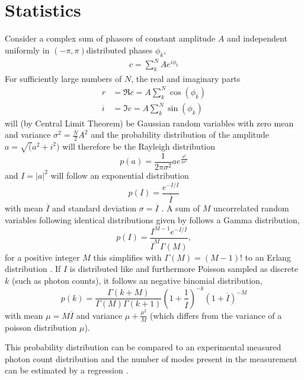 \section{Statistics}
Consider a complex sum of phasors of constant amplitude $A$ and independent uniformly in $(-\pi,\pi)$distributed phases $\phi_k$,
\begin{align}
c=\sum^N_k A e^{i\phi_k}
\end{align}
For sufficiently large numbers of $N$, the real and imaginary parts
\begin{align*}
r&=\Re c =  A \sum^N_k \cos(\phi_k)\\
i&= \Im c =A \sum^N_k \sin(\phi_k)
\end{align*}
will (by Central Limit Theorem) be Gaussian random variables with zero mean and variance $\sigma^2=\frac{N}{2}A^2$ and the probability distribution of the amplitude $a=\sqrt(a^2+i^2)$ will  therefore be the Rayleigh distribution
\begin{equation}
p(a)=\frac{1}{2\pi\sigma^2} a e^{\frac{a^2}{2\sigma^2}}
\end{equation}
and  $I=\left|a\right|^2$ will  follow an exponential distribution
\begin{equation}
\label{eq:expdistr}
p(I)=\frac{ e^{-I/\overline{I}}}{\overline{I}}
\end{equation} 
with mean $\overline{I}$ and standard deviation $\sigma=\overline{I}$  \cite{goodman2000,goodman1976}.
A sum of $M$ uncorrelated random variables following identical distributions given by  follows a Gamma distribution,
\begin{equation}
\label{eq:gammadistr}
p(I)=\frac{I^{M-1} e^{-I/\overline{I}}} {\overline{I}^M \Gamma(M)},
\end{equation}
for a positive integer $M$ this simplifies with $\Gamma(M)=(M-1)!$ to an Erlang distribution  \cite{forbes2010,trost2020}.
If $I$ is distributed like  and furthermore Poisson sampled as discrete $k$ (such as photon counts), it follows  an negative binomial distribution,
\cite{trost2020,mandel1959,holmes2019}
\begin{equation}
p(k)=
\frac{\Gamma(k+M)}{\Gamma(M)\Gamma(k+1) }
\left( 1+\frac{1}{\overline{I}}
\right)^{-k}
\left( 1+\overline{I}
\right)^{-M}
\end{equation}
with mean $\mu=M\overline{I}$ and variance $\mu+\frac{\mu^2}{M}$ (which differs from the variance of a poisson distribution $\mu$).

This probability distribution can be compared to an experimental measured photon count distribution and the number of modes present in the measurement can be estimated by a regression \cite{lehmkuhler2014,yun2019}.

